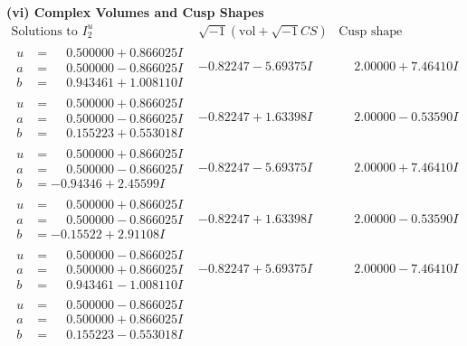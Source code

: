 \documentclass[1p]{elsarticle_modified}
\theoremstyle{definition}
\newcommand{\I}{\sqrt{-1}}
\begin{document}
\newpage\flushleft \textbf{(vi) Complex Volumes and Cusp Shapes}
$$\begin{array}{c|c|c}  
\text{Solutions to }I^u_{2}& \I (\text{vol} + \sqrt{-1}CS) & \text{Cusp shape}\\
 \hline 
\begin{aligned}
u &= \phantom{-}0.500000 + 0.866025 I \\
a &= \phantom{-}0.500000 - 0.866025 I \\
b &= \phantom{-}0.943461 + 1.008110 I\end{aligned}
 & -0.82247 - 5.69375 I & \phantom{-}2.00000 + 7.46410 I \\ \hline\begin{aligned}
u &= \phantom{-}0.500000 + 0.866025 I \\
a &= \phantom{-}0.500000 - 0.866025 I \\
b &= \phantom{-}0.155223 + 0.553018 I\end{aligned}
 & -0.82247 + 1.63398 I & \phantom{-}2.00000 - 0.53590 I \\ \hline\begin{aligned}
u &= \phantom{-}0.500000 + 0.866025 I \\
a &= \phantom{-}0.500000 - 0.866025 I \\
b &= -0.94346 + 2.45599 I\end{aligned}
 & -0.82247 - 5.69375 I & \phantom{-}2.00000 + 7.46410 I \\ \hline\begin{aligned}
u &= \phantom{-}0.500000 + 0.866025 I \\
a &= \phantom{-}0.500000 - 0.866025 I \\
b &= -0.15522 + 2.91108 I\end{aligned}
 & -0.82247 + 1.63398 I & \phantom{-}2.00000 - 0.53590 I \\ \hline\begin{aligned}
u &= \phantom{-}0.500000 - 0.866025 I \\
a &= \phantom{-}0.500000 + 0.866025 I \\
b &= \phantom{-}0.943461 - 1.008110 I\end{aligned}
 & -0.82247 + 5.69375 I & \phantom{-}2.00000 - 7.46410 I \\ \hline\begin{aligned}
u &= \phantom{-}0.500000 - 0.866025 I \\
a &= \phantom{-}0.500000 + 0.866025 I \\
b &= \phantom{-}0.155223 - 0.553018 I\end{aligned}

\end{array}$$
\end{document}
